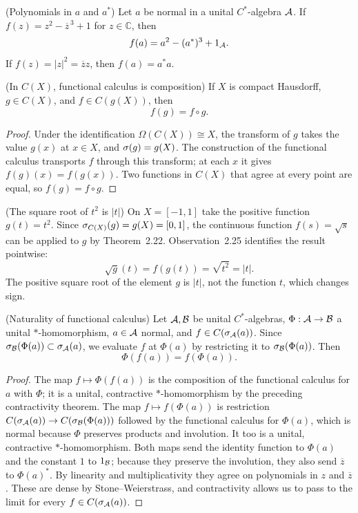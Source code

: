\begin{cthobservacion}{(Polynomials in $a$ and $a^*$)}
Let $a$ be normal in a unital $C^*$-algebra $\mathcal A$. If
$f(z)=z^2-\overline z^{\,3}+1$ for $z\in\mathbb C$, then
\[
 f(a)=a^2-(a^*)^3+1_\mathcal A.
\]
If $f(z)=|z|^2=\overline z z$, then $f(a)=a^*a$.
\end{cthobservacion}

\begin{cthobservacion}{(In $C(X)$, functional calculus is composition)}
If $X$ is compact Hausdorff, $g\in C(X)$, and $f\in C(g(X))$, then
\[
 f(g)=f\circ g.
\]
\end{cthobservacion}

\begin{proof}[Proof]
Under the identification $\Omega(C(X))\cong X$, the transform of $g$ takes
the value $g(x)$ at $x\in X$, and $\sigma(g)=g(X)$. The construction of the
functional calculus transports $f$ through this transform; at each $x$ it
gives $f(g)(x)=f(g(x))$. Two functions in $C(X)$ that agree at every point
are equal, so $f(g)=f\circ g$.
\end{proof}

\begin{cthejemplo}{(The square root of $t^2$ is $|t|$)}
On $X=[-1,1]$ take the positive function $g(t)=t^2$.
Since $\sigma_{C(X)}(g)=g(X)=[0,1]$, the continuous function
$f(s)=\sqrt s$ can be applied to $g$ by Theorem~2.22.
Observation~2.25 identifies the result pointwise:
\[
 \sqrt g(t)=f(g(t))=\sqrt{t^2}=|t|.
\]
The positive square root of the element $g$ is $|t|$, not the function $t$,
which changes sign.
\end{cthejemplo}

\begin{cthlema}{(Naturality of functional calculus)}
Let $\mathcal A,\mathcal B$ be unital $C^*$-algebras, $\Phi:\mathcal A\to\mathcal B$ a unital $*$-homomorphism,
$a\in\mathcal A$ normal, and $f\in C(\sigma_\mathcal A(a))$. Since
$\sigma_\mathcal B(\Phi(a))\subset\sigma_\mathcal A(a)$, we evaluate $f$ at $\Phi(a)$ by
restricting it to $\sigma_\mathcal B(\Phi(a))$. Then
\[
 \Phi(f(a))=f(\Phi(a)).
\]
\end{cthlema}

\begin{proof}[Proof]
The map $f\mapsto\Phi(f(a))$ is the composition of the functional calculus
for $a$ with $\Phi$; it is a unital, contractive $*$-homomorphism by the
preceding contractivity theorem.
The map $f\mapsto f(\Phi(a))$ is restriction
$C(\sigma_\mathcal A(a))\to C(\sigma_\mathcal B(\Phi(a)))$ followed by the functional calculus
for $\Phi(a)$, which is normal because $\Phi$ preserves products and
involution. It too is a unital, contractive $*$-homomorphism. Both maps send
the identity function to $\Phi(a)$ and the constant $1$ to $1_\mathcal B$; because
they preserve the involution, they also send $\overline z$ to $\Phi(a)^*$.
By linearity and multiplicativity they agree on polynomials in $z$ and
$\overline z$. These are dense by Stone--Weierstrass, and contractivity
allows us to pass to the limit for every $f\in C(\sigma_\mathcal A(a))$.
\end{proof}

